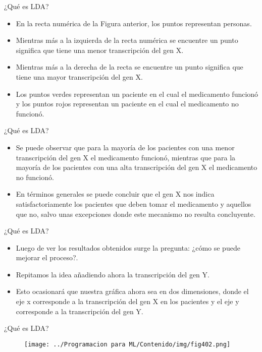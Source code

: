 \documentclass[11pt,aspectratio=169]{beamer}
\begin{document}
\begin{frame}{¿Qué es LDA?}
\begin{itemize}
	\item En la recta numérica de la Figura anterior, los puntos representan personas. \pause
	\item Mientras más a la izquierda de la recta numérica se encuentre un punto significa que tiene una menor transcripción del gen X.\pause
	\item Mientras más a la derecha de la recta se encuentre un punto significa que tiene una mayor transcripción del gen X. \pause
	\item Los puntos verdes representan un paciente en el cual el medicamento funcionó y los puntos rojos representan un paciente en el cual 
		el medicamento no funcionó. 
\end{itemize}
\end{frame}

\begin{frame}{¿Qué es LDA?}
\begin{itemize}
	\item Se puede observar que para la mayoría de los pacientes con una menor transcripción del gen X el medicamento funcionó, mientras que 
		para la mayoría de los pacientes con una alta transcripción del gen X el medicamento no funcionó. \pause
	\item En términos generales se puede concluir que el gen X nos indica satisfactoriamente los pacientes que deben tomar el medicamento y 
		aquellos que no, salvo unas excepciones donde este mecanismo no resulta concluyente.
\end{itemize}
\end{frame}

\begin{frame}{¿Qué es LDA?}
\begin{itemize}
	\item Luego de ver los resultados obtenidos surge la pregunta: ¿cómo se puede mejorar el proceso?.\pause
	\item Repitamos la idea añadiendo ahora la transcripción del gen Y.\pause
	\item Esto ocasionará que nuestra gráfica ahora sea en dos dimensiones, donde el eje x corresponde a la transcripción del gen X 
		en los pacientes y el eje y corresponde a la transcripción del gen Y.
\end{itemize}
\end{frame}

\begin{frame}{¿Qué es LDA?}
\begin{figure}[H]
	\centering
	\texttt{[image: ../Programacion para ML/Contenido/img/fig402.png]}
\end{figure}
\end{frame}
\end{document}
